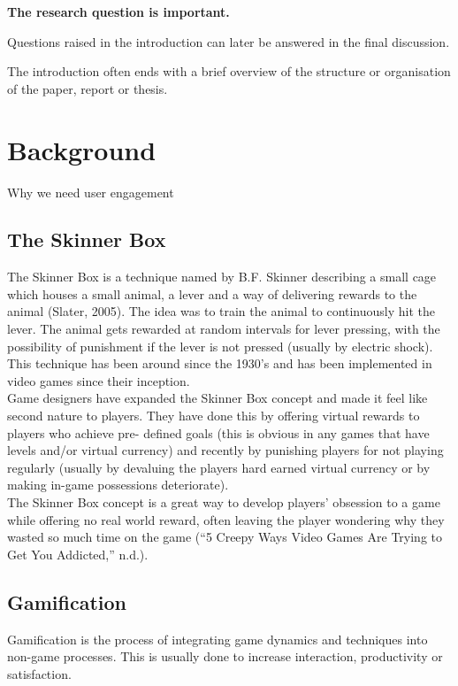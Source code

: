 \documentclass[a4,12pt]{article}
\newenvironment{boxit}{\begin{lrbox}{\savepar}
        \begin{minipage}[b]{4.6in}}
        {\end{minipage}\end{lrbox}\fbox{\usebox{\savepar}}}
\begin{document}
\begin{center}
\begin{boxit}
\textbf{The research question is important.}
\end{boxit}
\end{center}

Questions raised in the introduction can later be answered in the final discussion.

The introduction often ends with a brief overview of the structure or organisation of
the paper, report or thesis.

%
\section{Background}
Why we need user engagement
\subsection{The Skinner Box}
The Skinner Box is a technique named by B.F. Skinner describing a small cage which houses a small animal, a lever and a way of delivering rewards to the animal (Slater, 2005). The idea was to train the animal to continuously hit the lever. The animal gets rewarded at random intervals for lever pressing, with the possibility of punishment if the lever is not pressed (usually by electric shock). This technique has been around since the 1930’s and has been implemented in video games since their inception.
\\
Game designers have expanded the Skinner Box concept and made it feel like second nature to players. They have done this by offering virtual rewards to players who achieve pre- defined goals (this is obvious in any games that have levels and/or virtual currency) and recently by punishing players for not playing regularly (usually by devaluing the players hard earned virtual currency or by making in-game possessions deteriorate).
\\
The Skinner Box concept is a great way to develop players’ obsession to a game while offering no real world reward, often leaving the player wondering why they wasted so much time on the game \citep{QuinlanChalupMiddletonACRA2003}
(“5 Creepy Ways Video Games Are Trying to Get You Addicted,” n.d.).
\subsection{Gamification}
Gamification is the process of integrating game dynamics and techniques into non-game processes. This is usually done to increase interaction, productivity or satisfaction.
\end{document}
